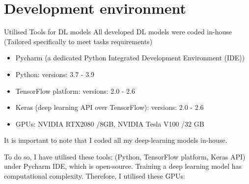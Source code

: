 \documentclass[10pt,aspectratio=169,dvipsnames]{beamer} %
\begin{document}
	\section{Development environment}
	\setcounter{subfigure}{0}
	\begin{frame}{Utilised Tools for DL models}
		All developed DL models were \alert{coded in-house} \\
		\alert{(Tailored specifically to meet tasks requirements)} 
		\begin{itemize}	
			\item \alert{Pycharm} (a dedicated Python Integrated Development Environment (IDE))		
			\item \alert{Python}: versions: 3.7 - 3.9
			\item \alert{TensorFlow} platform: versions: 2.0 - 2.6
			\item \alert{Keras} (deep learning API over TensorFlow): versions: 2.0 - 2.6
			\item \alert{GPUs}: NVIDIA RTX2080 /8GB, NVIDIA Tesla V100 /32 GB
		\end{itemize}
	\end{frame}
	\note
	{
		It is important to note that I coded all my deep-learning models in-house.
		
		To do so, I have utilised these tools:		
		(Python, TensorFlow platform, Keras API) under Pycharm IDE, which is open-source.
		Training a deep learning model has computational complexity.
		Therefore, I utilised these GPUs: 
	}
\end{document}
